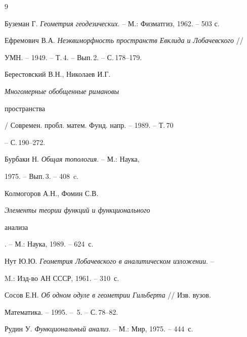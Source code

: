 \begin{thebibliography}{9}







Буземан Г. {\em Геометрия геодезических}. -- М.: Физматгиз, 1962. -- 503 с.




Ефремович В.А. {\em Неэквиморфность пространств Евклида и Лобачевского} //


УМН. -- 1949. -- Т.\,4. -- Вып.\,2. -- С.\,178--179.




Берестовский В.Н., Николаев И.Г. {\em Многомерные обобщенные римановы


пространства} / Современ. пробл. матем. Фунд. напр. -- 1989. -- Т.\,70


-- С.\,190--272.




Бурбаки Н. {\em Общая топология}. -- М.: Наука, 


1975. -- Вып.\,3. -- 408~c.




Колмогоров А.Н., Фомин С.В. {\em Элементы теории функций и функционального


анализа}. -- М.: Наука, 1989. -- 624~с.




Нут Ю.Ю. {\em Геометрия Лобачевского в аналитическом изложении}. --


M.: Изд-во АН СССР, 1961. -- 310~с.




Сосов Е.Н. {\em Об одном одуле в геометрии Гильберта} // Изв. вузов.


Математика. -- 1995. -- \No\,5. -- С.\,78--82.




Рудин У. {\em Функциональный анализ}. -- М.: Мир, 1975. -- 444~с.





\end{thebibliography}





\vskip 2cm














\label{end}








